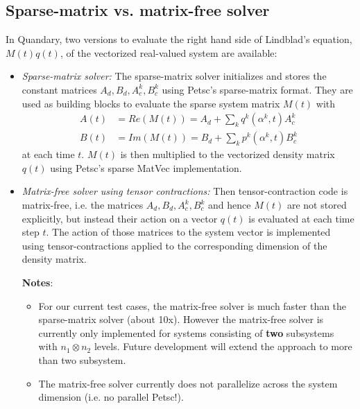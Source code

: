 \documentclass[letterpaper]{article}
\begin{document}
   \subsection{Sparse-matrix vs. matrix-free solver}

   In Quandary, two versions to evaluate the right hand side of Lindblad's
   equation, $M(t)q(t)$, of the vectorized real-valued system are available:
   \begin{itemize}
     \item \textit{Sparse-matrix solver:}
      The sparse-matrix solver initializes and stores the constant matrices
       $A_d,B_d, A_c^k, B_c^k$ using Petsc's sparse-matrix format. They are used
       as building blocks to evaluate the sparse system matrix $M(t)$ with 
     \begin{align}
       A(t) &= Re(M(t)) = A_d + \sum_kq^k(\alpha^k, t)A_c^k \\
       B(t) &= Im(M(t)) = B_d + \sum_k p^k(\alpha^k, t)B_c^k
     \end{align}
   at each time $t$. $M(t)$ is then multiplied to the vectorized density matrix
       $q(t)$ using Petsc's sparse MatVec implementation. 

   \item \textit{Matrix-free solver using tensor contractions:}
     Then tensor-contraction code is matrix-free, i.e. the matrices $A_d,B_d,
       A_c^k, B_c^k$ and hence $M(t)$ are not stored explicitly, but instead
       their action on a vector $q(t)$ is evaluated at each time step $t$. The
       action of those matrices to the system vector is implemented using
       tensor-contractions applied to the corresponding dimension of the density
       matrix. 

     \textbf{Notes}:
     \begin{itemize}
       \item For our current test cases, the matrix-free solver is much faster
         than the sparse-matrix solver (about 10x). However the matrix-free solver
         is currently only implemented for systems consisting of \textbf{two}
         subsystems with $n_1 \otimes n_2$ levels. Future development will
         extend the approach to more than two subsystem. 
       \item The matrix-free solver currently does not parallelize across the
         system dimension (i.e. no parallel Petsc!).
     \end{itemize}


   \end{itemize}
\end{document}
